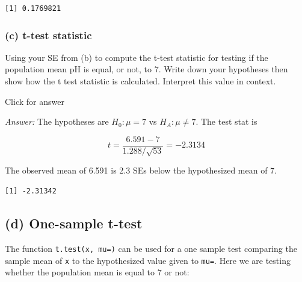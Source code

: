 \documentclass[
]{book}
\newenvironment{Shaded}{\begin{snugshade}}{\end{snugshade}}
\newcommand{\AttributeTok}[1]{\textcolor[rgb]{0.77,0.63,0.00}{#1}}
\newcommand{\DecValTok}[1]{\textcolor[rgb]{0.00,0.00,0.81}{#1}}
\newcommand{\FunctionTok}[1]{\textcolor[rgb]{0.00,0.00,0.00}{#1}}
\newcommand{\NormalTok}[1]{#1}
\newcommand{\SpecialCharTok}[1]{\textcolor[rgb]{0.00,0.00,0.00}{#1}}
\begin{document}
\begin{verbatim}
[1] 0.1769821
\end{verbatim}

\hypertarget{c-t-test-statistic}{%
\subsubsection{(c) t-test statistic}\label{c-t-test-statistic}}

Using your SE from (b) to compute the t-test statistic for testing if the population mean pH is equal, or not, to 7. Write down your hypotheses then show how the t test statistic is calculated. Interpret this value in context.

Click for answer

\emph{Answer:} The hypotheses are \(H_0: \mu = 7\) vs \(H_A: \mu \neq 7\). The test stat is

\[
t = \dfrac{6.591 - 7}{1.288/\sqrt{53}} = -2.3134
\]

The observed mean of 6.591 is 2.3 SEs below the hypothesized mean of 7.

\begin{Shaded}
\end{Shaded}

\begin{verbatim}
[1] -2.31342
\end{verbatim}

\hypertarget{d-one-sample-t-test}{%
\subsection{(d) One-sample t-test}\label{d-one-sample-t-test}}

The function \texttt{t.test(x,\ mu=)} can be used for a one sample test comparing the sample mean of \texttt{x} to the hypothesized value given to \texttt{mu=}. Here we are testing whether the population mean is equal to 7 or not:

\begin{Shaded}
\end{Shaded}
\end{document}
